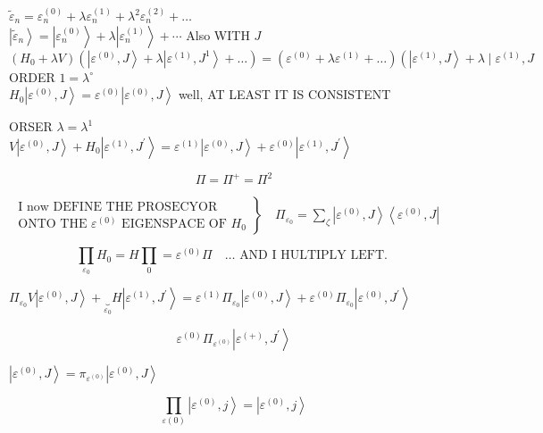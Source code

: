 \documentclass[10pt]{article}
\begin{document}
$\widetilde{\varepsilon}_{n}=\varepsilon_{n}^{(0)}+\lambda \varepsilon_{n}^{(1)}+\lambda^{2} \varepsilon_{n}^{(2)}+\ldots$\\
$\left|\tilde{\varepsilon}_{n}\right\rangle=\left|\varepsilon_{n}^{(0)}\right\rangle+\lambda\left|\varepsilon_{n}^{(1)}\right\rangle+\cdots$ Also WITH $J$\\
$\left(H_{0}+\lambda V\right)\left(\left|\varepsilon^{(0)}, J\right\rangle+\lambda\left|\varepsilon^{(1)}, J^{1}\right\rangle+\ldots\right)=\left(\varepsilon^{(0)}+\lambda \varepsilon^{(1)}+\ldots\right)\left(\left|\varepsilon^{(1)}, J\right\rangle+\lambda \mid \varepsilon^{(1)}, J\right.$\\
ORDER $1=\lambda^{\circ}$\\
$H_{0}\left|\varepsilon^{(0)}, J\right\rangle=\varepsilon^{(0)}\left|\varepsilon^{(0)}, J\right\rangle$ well, AT LEAST IT IS CONSISTENT

ORSER $\lambda=\lambda^{1}$\\
$V\left|\varepsilon^{(0)}, J\right\rangle+H_{0}\left|\varepsilon^{(1)}, J^{\prime}\right\rangle=\varepsilon^{(1)}\left|\varepsilon^{(0)}, J\right\rangle+\varepsilon^{(0)}\left|\varepsilon^{(1)}, J^{\prime}\right\rangle$

$$
\Pi=\Pi^{+}=\Pi^{2}
$$

$\left.\begin{array}{l}\text { I now DEFINE THE PROSECYOR } \\ \text { ONTO THE } \varepsilon^{(0)} \text { EIGENSPACE OF } H_{0}\end{array}\right\} \quad \Pi_{\varepsilon_{0}}=\sum_{\zeta}\left|\varepsilon^{(0)}, J\right\rangle\left\langle\varepsilon^{(0)}, J\right|$

$$
\prod_{\varepsilon_{0}} H_{0}=H \prod_{0}=\varepsilon^{(0)} \Pi \quad \ldots \text { AND I HULTIPLY LEFT. }
$$

$\Pi_{\varepsilon_{0}} V\left|\varepsilon^{(0)}, J\right\rangle+\underbrace{}_{\varepsilon_{0}} H\left|\varepsilon^{(1)}, J^{\prime}\right\rangle=\varepsilon^{(1)} \Pi_{\varepsilon_{0}}\left|\varepsilon^{(0)}, J\right\rangle+\varepsilon^{(0)} \Pi_{\varepsilon_{0}}\left|\varepsilon^{(0)}, J^{\prime}\right\rangle$

$$
\varepsilon^{(0)} \Pi_{\varepsilon^{(0)}}\left|\varepsilon^{(+)}, J^{\prime}\right\rangle
$$

$\left|\varepsilon^{(0)}, J\right\rangle=\pi_{\varepsilon^{(0)}}\left|\varepsilon^{(0)}, J\right\rangle$

$$
\prod_{\varepsilon(0)}\left|\varepsilon^{(0)}, j\right\rangle=\left|\varepsilon^{(0)}, j\right\rangle
$$
\end{document}
